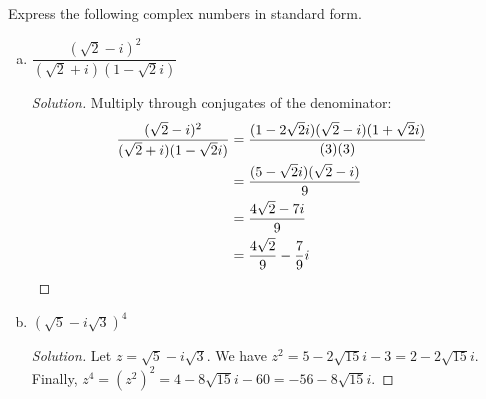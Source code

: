 \documentclass[tikz]{agony}
\begin{document}

\question Express the following complex numbers in standard form.
\begin{enumerate}[(a)]
  \item $\dfrac{(\sqrt2-i)^2}{(\sqrt2+i)(1-\sqrt2i)}$
        \begin{proof}[Solution]
          Multiply through conjugates of the denominator:
          \begin{align*}
            \frac{(\sqrt2-i)^2}{(\sqrt2+i)(1-\sqrt2i)}
             & = \frac{(1-2\sqrt{2}i)(\sqrt{2}-i)(1+\sqrt{2}i)}{(3)(3)} \\
             & = \frac{(5-\sqrt2i)(\sqrt2-i)}{9}                       \\
             & = \frac{4\sqrt2-7i}{9}                                  \\
             & = \frac{4\sqrt2}{9}-\frac{7}{9}i \qedhere
          \end{align*}
        \end{proof}
  \item $(\sqrt5-i\sqrt3)^4$
        \begin{proof}[Solution]
          Let $z=\sqrt5-i\sqrt3$.
          We have $z^2 = 5 - 2\sqrt{15} i - 3 = 2 - 2\sqrt{15} i$.
          Finally, $z^4 = (z^2)^2 = 4 - 8\sqrt{15} i - 60 = -56 - 8\sqrt{15}i$.
        \end{proof}
\end{enumerate}
\end{document}
